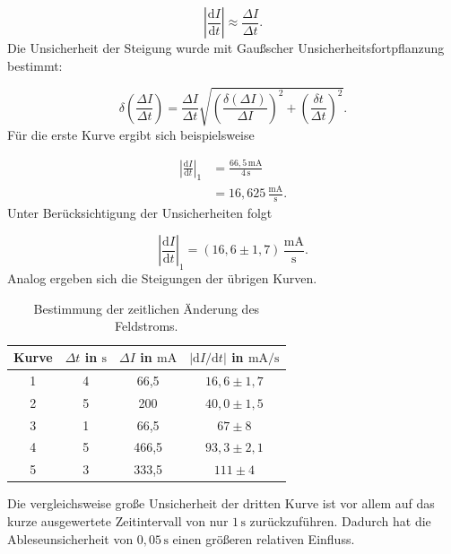 \documentclass{report}
\begin{document}
\begin{equation}
\left|
\frac{\mathrm dI}{\mathrm dt}
\right|
\approx
\frac{\Delta I}{\Delta t}.
\end{equation}
\noindent
Die Unsicherheit der Steigung wurde mit Gaußscher Unsicherheitsfortpflanzung
bestimmt:

\begin{equation}
\delta\left(
\frac{\Delta I}{\Delta t}
\right)
=
\frac{\Delta I}{\Delta t}
\sqrt{
\left(
\frac{\delta(\Delta I)}{\Delta I}
\right)^2
+
\left(
\frac{\delta t}{\Delta t}
\right)^2
}.
\end{equation}
\noindent
Für die erste Kurve ergibt sich beispielsweise

\begin{align}
\left|
\frac{\mathrm dI}{\mathrm dt}
\right|_1
&=
\frac{66{,}5\,\mathrm{mA}}{4\,\mathrm{s}}\\
&=
16{,}625\,\mathrm{\frac{mA}{s}}.
\end{align}
\noindent
Unter Berücksichtigung der Unsicherheiten folgt

\begin{equation}
\boxed{
\left|
\frac{\mathrm dI}{\mathrm dt}
\right|_1
=
(16{,}6\pm1{,}7)\,
\mathrm{\frac{mA}{s}}
}.
\end{equation}
\noindent
Analog ergeben sich die Steigungen der übrigen Kurven.

\begin{table}[htbp]
    \centering
    \caption{Bestimmung der zeitlichen Änderung des Feldstroms.}
    \label{tab:stromsteigungen_tv4}
    \begin{tabular}{c|c|c|c}
        \hline
        Kurve &
        $\Delta t$ in $\mathrm{s}$ &
        $\Delta I$ in $\mathrm{mA}$ &
        $\left|\mathrm dI/\mathrm dt\right|$ in $\mathrm{mA/s}$\\
        \hline
        1 & 4 & 66{,}5  & $16{,}6\pm1{,}7$\\
        2 & 5 & 200     & $40{,}0\pm1{,}5$\\
        3 & 1 & 66{,}5  & $67\pm8$\\
        4 & 5 & 466{,}5 & $93{,}3\pm2{,}1$\\
        5 & 3 & 333{,}5 & $111\pm4$\\
        \hline
    \end{tabular}
\end{table}
\noindent
Die vergleichsweise große Unsicherheit der dritten Kurve ist vor allem auf das kurze
ausgewertete Zeitintervall von nur $1\,\mathrm{s}$ zurückzuführen. Dadurch hat die
Ableseunsicherheit von $0{,}05\,\mathrm{s}$ einen größeren relativen Einfluss.
\end{document}
